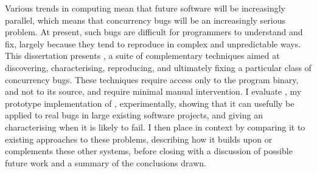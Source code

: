 Various trends in computing mean that future software will be
increasingly parallel, which means that concurrency bugs will be an
increasingly serious problem.  At present, such bugs are difficult for
programmers to understand and fix, largely because they tend to
reproduce in complex and unpredictable ways.  This dissertation
presents {\technique}, a suite of complementary techniques aimed at
discovering, characterising, reproducing, and ultimately fixing a
particular class of concurrency bugs.  These techniques require access
only to the program binary, and not to its source, and require minimal
manual intervention.  I evaluate {\implementation}, my prototype
implementation of {\technique}, experimentally, showing that it can
usefully be applied to real bugs in large existing software projects,
and giving an characterising when it is likely to fail.  I then place
{\technique} in context by comparing it to existing approaches to
these problems, describing how it builds upon or complements these
other systems, before closing with a discussion of possible future
work and a summary of the conclusions drawn.
